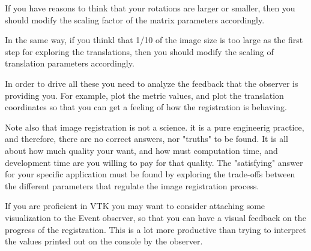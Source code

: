 If you have reasons to think that your rotations are larger or
smaller, then you should modify the scaling factor of the  matrix
parameters accordingly.

In the same way, if you thinkl that 1/10 of the image size is too
large as the first step for exploring the translations, then you
should modify the scaling of  translation parameters accordingly.



In order to drive all these you need to analyze the feedback that
the observer is providing you. For example, plot the metric values,
and plot the translation coordinates so that you can get a feeling
of how the registration is behaving.


Note also that image registration is not a science. it is a pure
engineerig practice, and therefore, there are no correct answers,
nor "truths" to be found. It is all about how much quality your want,
and how must computation time, and development time are you
willing to pay for that quality. The "satisfying" answer for your
specific application must be found by exploring the trade-offs
between the different parameters that regulate the image
registration process.

If you are proficient in VTK you may want to consider attaching
some visualization to the Event observer, so that you can have
a visual feedback on the progress of the registration. This is a
lot more productive than trying to interpret the values printed
out on the console by the observer.
